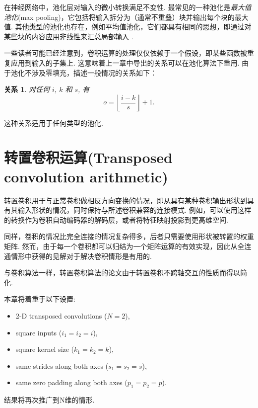 \documentclass[notitlepage]{ctexrep}
\newtheorem{relationship}{关系}
\begin{document}
在神经网络中，池化层对输入的微小转换满足不变性. 最常见的一种池化是\emph{最大值池化}(max pooling)，它包括将输入拆分为（通常不重叠）块并输出每个块的最大值. 其他类型的池化也存在，例如平均值池化，它们都具有相同的思想，即通过对某些块的内容应用非线性来汇总局部输入 \citep{%
boureau-cvpr-10,boureau-icml-10,boureau-iccv-11,ICML2011Saxe_551}.

一些读者可能已经注意到，卷积运算的处理仅仅依赖于一个假设，即某些函数被重复应用到输入的子集上. 这意味着上一章中导出的关系可以在池化算法下重用. 由于池化不涉及零填充，描述一般情况的关系如下： 

\begin{relationship}\label{rel:pooling}
对任何 $i$, $k$ 和 $s$, 有
\begin{equation*}
    o = \left\lfloor \frac{i - k}{s} \right\rfloor + 1.
\end{equation*}
\end{relationship}

\noindent 这种关系适用于任何类型的池化.

\chapter{转置卷积运算(Transposed convolution arithmetic)}

转置卷积用于与正常卷积做相反方向变换的情况，即从具有某种卷积输出形状到具有其输入形状的情况，同时保持与所述卷积兼容的连接模式. 例如，可以使用这样的转换作为卷积自动编码器的解码层，或者将特征映射投影到更高维空间.

同样，卷积的情况比完全连接的情况复杂得多，后者只需要使用形状被转置的权重矩阵. 然而，由于每一个卷积都可以归结为一个矩阵运算的有效实现，因此从全连通情形中获得的见解对于解决卷积情形是有用的.

与卷积算法一样，转置卷积算法的论文由于转置卷积不跨轴交互的性质而得以简化.

本章将着重于以下设置:

\begin{itemize}
    \item 2-D transposed convolutions ($N = 2$),
    \item square inputs ($i_1 = i_2 = i$),
    \item square kernel size ($k_1 = k_2 = k$),
    \item same strides along both axes ($s_1 = s_2 = s$),
    \item same zero padding along both axes ($p_1 = p_2 = p$).
\end{itemize}

\noindent 结果将再次推广到N维的情形.
\end{document}
